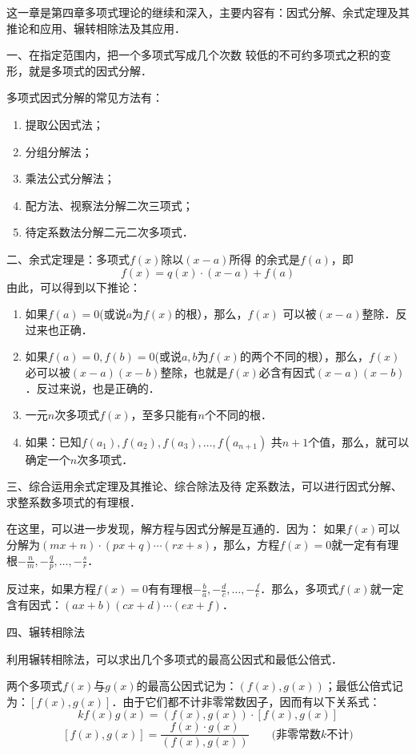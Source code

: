 这一章是第四章多项式理论的继续和深入，主要内容有：因式分解、余式定理及其推论和应用、辗转相除法及其应用．

一、在指定范围内，把一个多项式写成几个次数
较低的不可约多项式之积的变形，就是多项式的因式分解．

多项式因式分解的常见方法有：
\begin{enumerate}
    \item 提取公因式法；
    \item 分组分解法；
    \item 乘法公式分解法；
    \item 配方法、视察法分解二次三项式；
    \item 待定系数法分解二元二次多项式．
\end{enumerate} 

二、余式定理是：多项式$f(x)$除以$(x-a)$所得
的余式是$f(a)$，即
\[f (x) =q (x) \cdot (x-a) +f (a) \]
由此，可以得到以下推论：
\begin{enumerate}
\item 如果$f(a)=0$(或说$a$为$f(x)$的根），那么，$f(x)$
可以被$(x-a)$整除．反过来也正确．
\item 如果$f(a)=0,f(b)=0$(或说$a,b$为$f(x)$的两个不同的根），那么，$f(x)$必可以被$(x-a)(x-b)$整除，也就是$f(x)$必含有因式$(x-a)(x-b)$．反过来说，也是正确的．
\item 一元$n$次多项式$f(x)$，至多只能有$n$个不同的根．
\item  如果：已知$f(a_1),f(a_2),f(a_3),\ldots,f(a_{n+1})$
共$n+1$个值，那么，就可以确定一个$n$次多项式．
\end{enumerate}

三、综合运用余式定理及其推论、综合除法及待
定系数法，可以进行因式分解、求整系数多项式的有理根．

在这里，可以进一步发现，解方程与因式分解是互通的．因为：
如果$f(x)$可以分解为$(mx+n)\cdot (px+q)\cdots (rx+s)$，那么，方程$f(x)=0$就一定有有理根$-\frac{n}{m},-\frac{q}{p},\ldots,-\frac{s}{r}$．

反过来，如果方程$f(x)=0$有有理根$-\frac{b}{a},-\frac{d}{c},\ldots,-\frac{f}{e}$．那么，多项式$f(x)$就一定含有因式：$(ax+b)(cx+d)\cdots(ex+f)$．

四、辗转相除法

利用辗转相除法，可以求出几个多项式的最高公因式和最低公倍式．

两个多项式$f(x)$与$g(x)$的最高公因式记为：$(f(x),g(x))$；最低公倍式记为：$[f(x), g(x)]$．由于它们都不计非零常数因子，因而有以下关系式：
\[ kf (x) g (x) = (f(x), g(x))\cdot [f(x),g(x)]\]
\[[f(x),g(x)]=\frac{f(x)\cdot g(x)}{(f(x), g(x))}\qquad \text{(非零常数$k$不计)}\]



